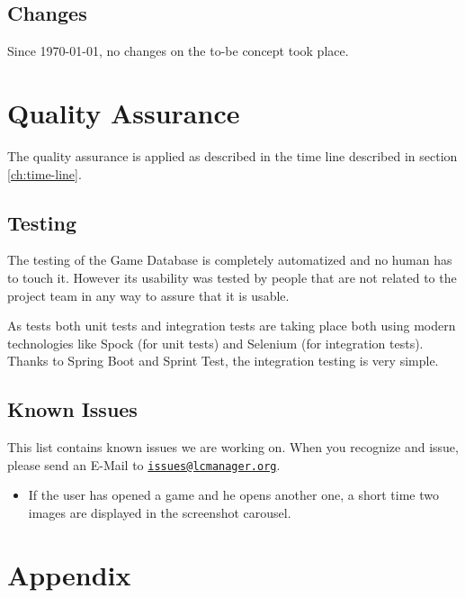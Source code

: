 \documentclass[12pt]{scrreprt}
\begin{document}
		\section{Changes}
			\label{sec:implementation_changes}

			Since \today, no changes on the to-be concept took place.



	\chapter{Quality Assurance}
		\label{ch:qa}

		The quality assurance is applied as described in the time line described in section \ref{ch:time-line}.

		\section{Testing}
			\label{sec:qa_testing}

			The testing of the Game Database is completely automatized and no human has to touch it. However its usability was tested by people that are not related to the project team in any way to assure that it is usable.

			As tests both unit tests and integration tests are taking place both using modern technologies like Spock (for unit tests) and Selenium (for integration tests). Thanks to Spring Boot and Sprint Test, the integration testing is very simple.


		\section{Known Issues}
			\label{sec:qa_issues}

			This list contains known issues we are working on. When you recognize and issue, please send an E-Mail to \href{mailto:issues@lcmanager.org}{\nolinkurl{issues@lcmanager.org}}.

			\begin{itemize}
				\item If the user has opened a game and he opens another one, a short time two images are displayed in the screenshot carousel.
			\end{itemize}



	\chapter{Appendix}
		\label{ch:appendix}
\end{document}
